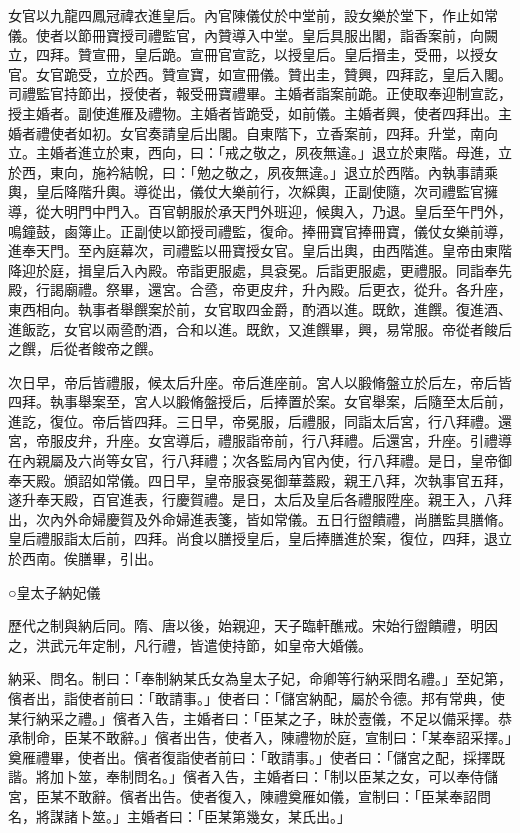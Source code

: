 女官以九龍四鳳冠禕衣進皇后。內官陳儀仗於中堂前，設女樂於堂下，作止如常儀。使者以節冊寶授司禮監官，內贊導入中堂。皇后具服出閣，詣香案前，向闕立，四拜。贊宣冊，皇后跪。宣冊官宣訖，以授皇后。皇后搢圭，受冊，以授女官。女官跪受，立於西。贊宣寶，如宣冊儀。贊出圭，贊興，四拜訖，皇后入閣。司禮監官持節出，授使者，報受冊寶禮畢。主婚者詣案前跪。正使取奉迎制宣訖，授主婚者。副使進雁及禮物。主婚者皆跪受，如前儀。主婚者興，使者四拜出。主婚者禮使者如初。女官奏請皇后出閣。自東階下，立香案前，四拜。升堂，南向立。主婚者進立於東，西向，曰：「戒之敬之，夙夜無違。」退立於東階。母進，立於西，東向，施衿結帨，曰：「勉之敬之，夙夜無違。」退立於西階。內執事請乘輿，皇后降階升輿。導從出，儀仗大樂前行，次綵輿，正副使隨，次司禮監官擁導，從大明門中門入。百官朝服於承天門外班迎，候輿入，乃退。皇后至午門外，鳴鐘鼓，鹵簿止。正副使以節授司禮監，復命。捧冊寶官捧冊寶，儀仗女樂前導，進奉天門。至內庭幕次，司禮監以冊寶授女官。皇后出輿，由西階進。皇帝由東階降迎於庭，揖皇后入內殿。帝詣更服處，具袞冕。后詣更服處，更禮服。同詣奉先殿，行謁廟禮。祭畢，還宮。合巹，帝更皮弁，升內殿。后更衣，從升。各升座，東西相向。執事者舉饌案於前，女官取四金爵，酌酒以進。既飲，進饌。復進酒、進飯訖，女官以兩巹酌酒，合和以進。既飲，又進饌畢，興，易常服。帝從者餕后之饌，后從者餕帝之饌。

次日早，帝后皆禮服，候太后升座。帝后進座前。宮人以腶脩盤立於后左，帝后皆四拜。執事舉案至，宮人以腶脩盤授后，后捧置於案。女官舉案，后隨至太后前，進訖，復位。帝后皆四拜。三日早，帝冕服，后禮服，同詣太后宮，行八拜禮。還宮，帝服皮弁，升座。女宮導后，禮服詣帝前，行八拜禮。后還宮，升座。引禮導在內親屬及六尚等女官，行八拜禮；次各監局內官內使，行八拜禮。是日，皇帝御奉天殿。頒詔如常儀。四日早，皇帝服袞冕御華蓋殿，親王八拜，次執事官五拜，遂升奉天殿，百官進表，行慶賀禮。是日，太后及皇后各禮服陞座。親王入，八拜出，次內外命婦慶賀及外命婦進表箋，皆如常儀。五日行盥饋禮，尚膳監具膳脩。皇后禮服詣太后前，四拜。尚食以膳授皇后，皇后捧膳進於案，復位，四拜，退立於西南。俟膳畢，引出。

○皇太子納妃儀

歷代之制與納后同。隋、唐以後，始親迎，天子臨軒醮戒。宋始行盥饋禮，明因之，洪武元年定制，凡行禮，皆遣使持節，如皇帝大婚儀。

納采、問名。制曰：「奉制納某氏女為皇太子妃，命卿等行納采問名禮。」至妃第，儐者出，詣使者前曰：「敢請事。」使者曰：「儲宮納配，屬於令德。邦有常典，使某行納采之禮。」儐者入告，主婚者曰：「臣某之子，昧於壼儀，不足以備采擇。恭承制命，臣某不敢辭。」儐者出告，使者入，陳禮物於庭，宣制曰：「某奉詔采擇。」奠雁禮畢，使者出。儐者復詣使者前曰：「敢請事。」使者曰：「儲宮之配，採擇既諧。將加卜筮，奉制問名。」儐者入告，主婚者曰：「制以臣某之女，可以奉侍儲宮，臣某不敢辭。儐者出告。使者復入，陳禮奠雁如儀，宣制曰：「臣某奉詔問名，將謀諸卜筮。」主婚者曰：「臣某第幾女，某氏出。」

